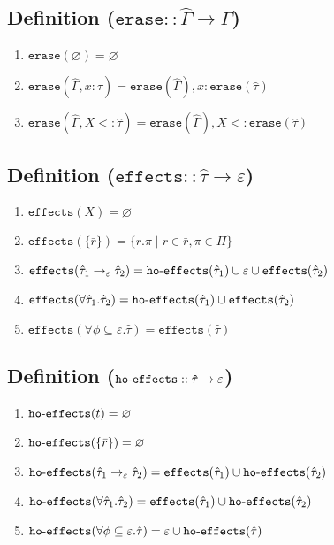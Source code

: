 \documentclass{llncs}
\newcommand{\keywadj}[1]{\mathtt{#1}}
\newcommand{\kwa}[1]{\keywadj{ #1 }}
\newcommand{\hyphen}{\hbox{-}}
\newcommand{\fx}[1]{ \kwa{effects}(#1) }
\newcommand{\hofx}[1]{ \kwa{ho \hyphen effects}(#1) }
\newcommand{\erase}[1]{
	\keywadj{erase}(#1)
}
\begin{document}
\subsection*{Definition ($\kwa{erase :: \hat \Gamma \rightarrow \Gamma}$)}

\begin{enumerate}
	\item $\erase{\varnothing} = \varnothing$
	\item $\erase{\hat \Gamma, x: \hat \tau} = \erase{\hat \Gamma}, x: \erase{\hat \tau}$
	\item $\erase{\hat \Gamma, X <: \hat \tau} = \erase{\hat \Gamma}, X <: \erase{\hat \tau}$
\end{enumerate}


\subsection*{Definition ($\kwa{effects :: \hat \tau \rightarrow \varepsilon}$)}

\begin{enumerate}
	\item $\fx{X} = \varnothing$
	\item $\fx{\{ \bar r \}} = \{ r.\pi \mid r \in \bar r, \pi \in \Pi \}$
	\item $\fx{\hat \tau_1 \rightarrow_{\varepsilon} \hat \tau_2} = \kwa{ho \hyphen effects}(\hat \tau_1) \cup \varepsilon \cup \kwa{effects}(\hat \tau_2)$
	\item $\fx{\forall \hat \tau_1. \hat \tau_2} = \hofx{\hat \tau_1} \cup \fx{\hat \tau_2}$
	\item $\fx{\forall \phi \subseteq \varepsilon. \hat \tau} = \fx{\hat \tau}$
\end{enumerate}

\subsection*{Definition ($\kwa{ho \hyphen effects :: \hat \tau \rightarrow \varepsilon}$)}

\begin{enumerate}
	\item $\hofx{t} = \varnothing$
	\item $\hofx{\{ \bar r \}} = \varnothing$
	\item $\hofx{\hat \tau_1 \rightarrow_{\varepsilon} \hat \tau_2} = \kwa{effects}(\hat \tau_1) \cup \kwa{ho \hyphen effects}(\hat \tau_2)$
	\item $\hofx{\forall \hat \tau_1. \hat \tau_2} = \fx{\hat \tau_1} \cup \hofx{\hat \tau_2}$
	\item $\hofx{\forall \phi \subseteq \varepsilon.  \hat \tau} = \varepsilon \cup \hofx{\hat \tau}$
\end{enumerate}
\end{document}
